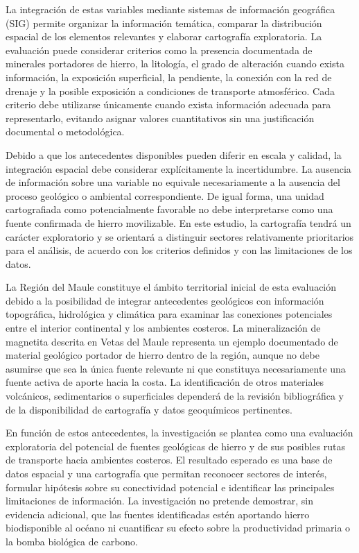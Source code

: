 La integración de estas variables mediante sistemas de información geográfica (SIG) permite organizar la información temática, comparar la distribución espacial de los elementos relevantes y elaborar cartografía exploratoria. La evaluación puede considerar criterios como la presencia documentada de minerales portadores de hierro, la litología, el grado de alteración cuando exista información, la exposición superficial, la pendiente, la conexión con la red de drenaje y la posible exposición a condiciones de transporte atmosférico. Cada criterio debe utilizarse únicamente cuando exista información adecuada para representarlo, evitando asignar valores cuantitativos sin una justificación documental o metodológica.

Debido a que los antecedentes disponibles pueden diferir en escala y calidad, la integración espacial debe considerar explícitamente la incertidumbre. La ausencia de información sobre una variable no equivale necesariamente a la ausencia del proceso geológico o ambiental correspondiente. De igual forma, una unidad cartografiada como potencialmente favorable no debe interpretarse como una fuente confirmada de hierro movilizable. En este estudio, la cartografía tendrá un carácter exploratorio y se orientará a distinguir sectores relativamente prioritarios para el análisis, de acuerdo con los criterios definidos y con las limitaciones de los datos.

La Región del Maule constituye el ámbito territorial inicial de esta evaluación debido a la posibilidad de integrar antecedentes geológicos con información topográfica, hidrológica y climática para examinar las conexiones potenciales entre el interior continental y los ambientes costeros. La mineralización de magnetita descrita en Vetas del Maule representa un ejemplo documentado de material geológico portador de hierro dentro de la región, aunque no debe asumirse que sea la única fuente relevante ni que constituya necesariamente una fuente activa de aporte hacia la costa. La identificación de otros materiales volcánicos, sedimentarios o superficiales dependerá de la revisión bibliográfica y de la disponibilidad de cartografía y datos geoquímicos pertinentes.

En función de estos antecedentes, la investigación se plantea como una evaluación exploratoria del potencial de fuentes geológicas de hierro y de sus posibles rutas de transporte hacia ambientes costeros. El resultado esperado es una base de datos espacial y una cartografía que permitan reconocer sectores de interés, formular hipótesis sobre su conectividad potencial e identificar las principales limitaciones de información. La investigación no pretende demostrar, sin evidencia adicional, que las fuentes identificadas estén aportando hierro biodisponible al océano ni cuantificar su efecto sobre la productividad primaria o la bomba biológica de carbono.

